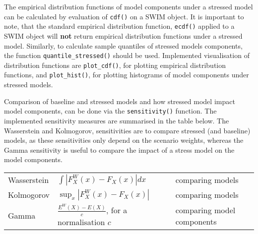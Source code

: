 \documentclass[]{article}
\begin{document}
The empirical distribution functions of model components under a stressed model can be calculated by evaluation of \texttt{cdf()} on a SWIM object. It is important to note, that the standard empirical distribution function, \texttt{ecdf()} applied to a SWIM object will \textbf{not} return empirical distribution functions under a stressed model. Similarly, to calculate sample quantiles of stressed models components, the function \texttt{quantile\_stressed()} should be used. Implemented visualisation of distribution functions are \texttt{plot\_cdf()}, for plotting empirical distribution functions, and \texttt{plot\_hist()}, for plotting histograms of model components under stressed models.

Comparison of baseline and stressed models and how stressed model impact model components, can be done via the \texttt{sensitivity()} function. The implemented sensitivity measures are summarised in the table below. The Wasserstein and Kolmogorov, sensitivities are to compare stressed (and baseline) models, as these sensitivities only depend on the scenario weights, whereas the Gamma sensitivity is useful to compare the impact of a stress model on the model components.

\begin{longtable}[]{@{}lll@{}}
\toprule
\endhead
\begin{minipage}[t]{0.30\columnwidth}\raggedright
Wasserstein\strut
\end{minipage} & \begin{minipage}[t]{0.30\columnwidth}\raggedright
\(\int | F^W_X (x) - F_X(x)| dx\)\strut
\end{minipage} & \begin{minipage}[t]{0.30\columnwidth}\raggedright
comparing models\strut
\end{minipage}\tabularnewline
\begin{minipage}[t]{0.30\columnwidth}\raggedright
Kolmogorov\strut
\end{minipage} & \begin{minipage}[t]{0.30\columnwidth}\raggedright
\(\sup_x |F^W_X (x) - F_X(x)|\)\strut
\end{minipage} & \begin{minipage}[t]{0.30\columnwidth}\raggedright
comparing models\strut
\end{minipage}\tabularnewline
\begin{minipage}[t]{0.30\columnwidth}\raggedright
Gamma\strut
\end{minipage} & \begin{minipage}[t]{0.30\columnwidth}\raggedright
\(\frac{E^W(X) - E(X)}{c}\), for a normalisation \(c\)\strut
\end{minipage} & \begin{minipage}[t]{0.30\columnwidth}\raggedright
comparing model components\strut
\end{minipage}\tabularnewline
\bottomrule
\end{longtable}
\end{document}
